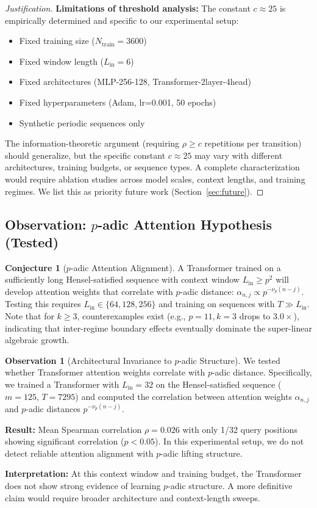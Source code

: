 \documentclass[11pt]{article}
\theoremstyle{plain}
\theoremstyle{definition}
\newtheorem{conjecture}[theorem]{Conjecture}
\newtheorem{observation}[theorem]{Observation}
\newcommand{\vp}{\nu_p}
\begin{document}
\begin{proof}[Justification]
\textbf{Limitations of threshold analysis:} The constant $c \approx 25$ is empirically determined and specific to our experimental setup:
\begin{itemize}[leftmargin=2em]
\item Fixed training size ($N_{\mathrm{train}} = 3600$)
\item Fixed window length ($L_{\mathrm{in}} = 6$)
\item Fixed architectures (MLP-256-128, Transformer-2layer-4head)
\item Fixed hyperparameters (Adam, lr=0.001, 50 epochs)
\item Synthetic periodic sequences only
\end{itemize}

The information-theoretic argument (requiring $\rho \geq c$ repetitions per transition) should generalize, but the specific constant $c \approx 25$ may vary with different architectures, training budgets, or sequence types. A complete characterization would require ablation studies across model scales, context lengths, and training regimes. We list this as priority future work (Section~\ref{sec:future}).
\end{proof}

\subsection{Observation: $p$-adic Attention Hypothesis (Tested)}

\begin{conjecture}[$p$-adic Attention Alignment]
\label{conj:padic}
A Transformer trained on a sufficiently long Hensel-satisfied sequence with context window $L_{\mathrm{in}} \geq p^2$ will develop attention weights that correlate with $p$-adic distance: $\alpha_{n,j} \propto p^{-\vp(n-j)}$. Testing this requires $L_{\mathrm{in}} \in \{64, 128, 256\}$ and training on sequences with $T \gg L_{\mathrm{in}}$.
Note that for $k \ge 3$, counterexamples exist (e.g., $p=11, k=3$ drops to $3.0\times$), indicating that inter-regime boundary effects eventually dominate the super-linear algebraic growth.
\end{conjecture}

\begin{observation}[Architectural Invariance to $p$-adic Structure]
\label{obs:padic}
We tested whether Transformer attention weights correlate with $p$-adic distance. Specifically, we trained a Transformer with $L_{\mathrm{in}}=32$ on the Hensel-satisfied sequence ($m=125$, $T=7295$) and computed the correlation between attention weights $\alpha_{n,j}$ and $p$-adic distances $p^{-\vp(n-j)}$.

\textbf{Result:} Mean Spearman correlation $\rho = 0.026$ with only 1/32 query positions showing significant correlation ($p < 0.05$). In this experimental setup, we do not detect reliable attention alignment with $p$-adic lifting structure.

\textbf{Interpretation:} At this context window and training budget, the Transformer does not show strong evidence of learning $p$-adic structure. A more definitive claim would require broader architecture and context-length sweeps.
\end{observation}
\end{document}
